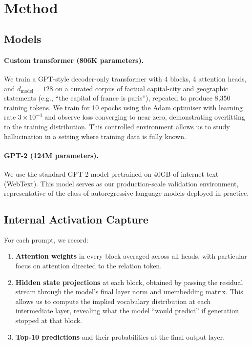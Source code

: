 \documentclass[11pt,a4paper]{article}
\begin{document}
\section{Method}

\subsection{Models}

\paragraph{Custom transformer (806K parameters).}
We train a GPT-style decoder-only transformer with 4 blocks,
4 attention heads, and $d_{\text{model}} = 128$ on a curated
corpus of factual capital-city and geographic statements
(e.g., ``the capital of france is paris''), repeated to produce
8,350 training tokens. We train for 10 epochs using the Adam
optimiser \citep{kingma2014adam} with learning rate
$3 \times 10^{-4}$ and observe loss converging to near zero,
demonstrating overfitting to the training distribution.
This controlled environment allows us to study hallucination
in a setting where training data is fully known.

\paragraph{GPT-2 (124M parameters).}
We use the standard GPT-2 model \citep{radford2019language}
pretrained on 40GB of internet text (WebText). This model
serves as our production-scale validation environment,
representative of the class of autoregressive language models
deployed in practice.

\subsection{Internal Activation Capture}

For each prompt, we record:
\begin{enumerate}
    \item \textbf{Attention weights} in every block averaged
    across all heads, with particular focus on attention
    directed to the relation token.

    \item \textbf{Hidden state projections} at each block,
    obtained by passing the residual stream through the
    model's final layer norm and unembedding matrix. This
    allows us to compute the implied vocabulary distribution
    at each intermediate layer, revealing what the model
    ``would predict'' if generation stopped at that block.

    \item \textbf{Top-10 predictions} and their probabilities
    at the final output layer.
\end{enumerate}
\end{document}
